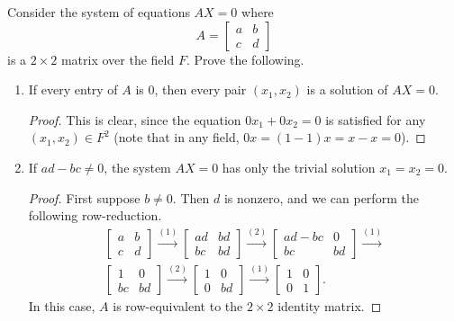  Consider the system of equations $AX = 0$ where
\begin{equation*}
  A =
  \begin{bmatrix}
    a & b \\
    c & d
  \end{bmatrix}
\end{equation*}
is a $2\times2$ matrix over the field $F$. Prove the following.
\begin{enumerate}
\item If every entry of $A$ is $0$, then every pair $(x_1,x_2)$ is a
  solution of $AX = 0$.
  \begin{proof}
    This is clear, since the equation $0x_1 + 0x_2 = 0$ is satisfied
    for any $(x_1,x_2)\in F^2$ (note that in any field,
    $0x = (1 - 1)x = x - x = 0$).
  \end{proof}
\item If $ad - bc \neq 0$, the system $AX = 0$ has only the trivial
  solution $x_1 = x_2 = 0$.
  \begin{proof}
    First suppose $b\neq0$. Then $d$ is nonzero, and we can perform
    the following row-reduction.
    \begin{gather*}
      \begin{bmatrix}
        a & b \\
        c & d
      \end{bmatrix}
      \xrightarrow{(1)}
      \begin{bmatrix}
        ad & bd \\
        bc & bd
      \end{bmatrix}
      \xrightarrow{(2)}
      \begin{bmatrix}
        ad - bc & 0 \\
        bc & bd
      \end{bmatrix}
      \xrightarrow{(1)} \\
      \begin{bmatrix}
        1 & 0 \\
        bc & bd
      \end{bmatrix}
      \xrightarrow{(2)}
      \begin{bmatrix}
        1 & 0 \\
        0 & bd
      \end{bmatrix}
      \xrightarrow{(1)}
      \begin{bmatrix}
        1 & 0 \\
        0 & 1
      \end{bmatrix}.
    \end{gather*}
    In this case, $A$ is row-equivalent to the $2\times2$ identity
    matrix.


\end{proof}
\end{enumerate}
